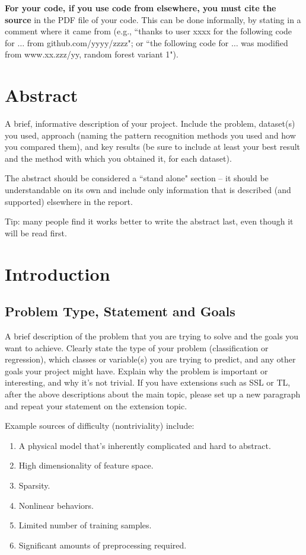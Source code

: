 \documentclass[singlecolumn]{article}
\begin{document}
\textbf{For your code, if you use code from elsewhere, you must cite the source} in the PDF file of your code. This can be done informally, by stating in a comment where it came from (e.g., ``thanks to user xxxx for the following code for $\dots$ from github.com/yyyy/zzzz"; or ``the following code for $\dots$ was modified from www.xx.zzz/yy, random forest variant 1").

\section{Abstract}
A brief, informative description of your project. Include the problem, dataset(s) you used, approach (naming the pattern recognition methods you used and how you compared them), and key results (be sure to include at least your best result and the method with which you obtained it, for each dataset).

The abstract should be considered a ``stand alone" section – it should be understandable on its own and include only information that is described (and supported) elsewhere in the report.
 
Tip: many people find it works better to write the abstract last, even though it will be read first. 

\section{Introduction}
\subsection{Problem Type, Statement and Goals}
A brief description of the problem that you are trying to solve and the goals you want to achieve.  Clearly state the type of your problem (classification or regression), which classes or variable(s) you are trying to predict, and any other goals your project might have. Explain why the problem is important or interesting, and why it’s not trivial. If you have extensions such as SSL or TL, after the above descriptions about the main topic, please set up a new paragraph and repeat your statement on the extension topic.

Example sources of difficulty (nontriviality) include:
\begin{enumerate}
	\item A physical model that’s inherently complicated and hard to abstract.
	\item High dimensionality of feature space.
	\item Sparsity.
	\item Nonlinear behaviors.
	\item Limited number of training samples.
	\item Significant amounts of preprocessing required.  
\end{enumerate}
\end{document}
